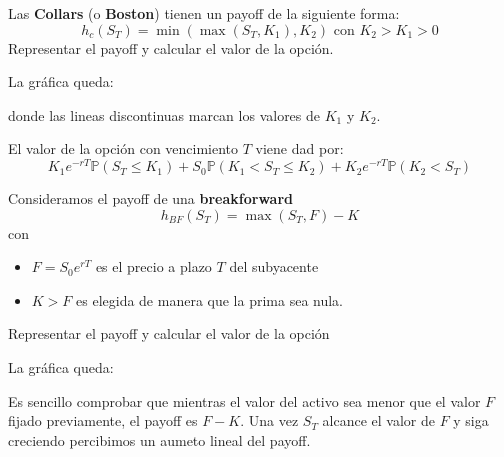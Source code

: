 \begin{problem}[3]
Las \textbf{Collars} (o \textbf{Boston}) tienen un payoff de la siguiente forma:
\[h_c(S_T) = \min\left(\max(S_T,K_1),K_2 \right)\text{ con } K_2 > K_1 > 0\]
Representar el payoff y calcular el valor de la opción.
\solution
{}

La gráfica queda:
\begin{center}
\end{center}

donde las lineas discontinuas marcan los valores de $K_1$ y $K_2$.

El valor de la opción con vencimiento $T$ viene dad por:
\[K_1e^{-rT}\mathbb{P}(S_T\leq K_1) + S_0 \mathbb{P}(K_1 < S_T \leq K_2) + K_2e^{-rT}\mathbb{P}(K_2 < S_T)\]

\end{problem}

\begin{problem}[4]
Consideramos el payoff de una \textbf{breakforward}
\[h_{BF}(S_T) = \max(S_T,F)-K\]
con
\begin{itemize}
\item $F=S_0e^{rT}$ es el precio a plazo $T$ del subyacente
\item $K>F$ es elegida de manera que la prima sea nula.
\end{itemize}

Representar el payoff y calcular el valor de la opción

\solution
{}

La gráfica queda:
\begin{center}
\end{center}

Es sencillo comprobar que mientras el valor del activo sea menor que el valor $F$ fijado previamente, el payoff es $F-K$. Una vez $S_T$ alcance el valor de $F$ y siga creciendo percibimos un aumeto lineal del payoff.

\end{problem}

